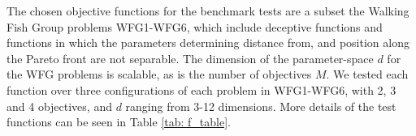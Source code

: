 \documentclass[conference]{IEEEtran}
\newcommand{\paretofront}{\mathcal{F}}
\newcommand{\parameterspace}{\mathcal{X}}
\newcommand{\ndim}{d}
\newcommand{\nobj}{M}
\begin{document}
The chosen objective functions for the benchmark tests are a subset the
Walking Fish Group problems \cite{huband2005scalable} WFG1-WFG6, which
include deceptive functions and functions in which the parameters
determining distance from, and position along the Pareto front are not
separable. The dimension of the parameter-space $\ndim$ for the WFG
problems is scalable, as is the number of objectives $\nobj$. We tested
each function over three configurations of each problem in WFG1-WFG6, with
2, 3 and 4 objectives, and $\ndim$ ranging from 3-12 dimensions.  More details of the test functions can be seen in Table \ref{tab: f_table}.


\end{document}
